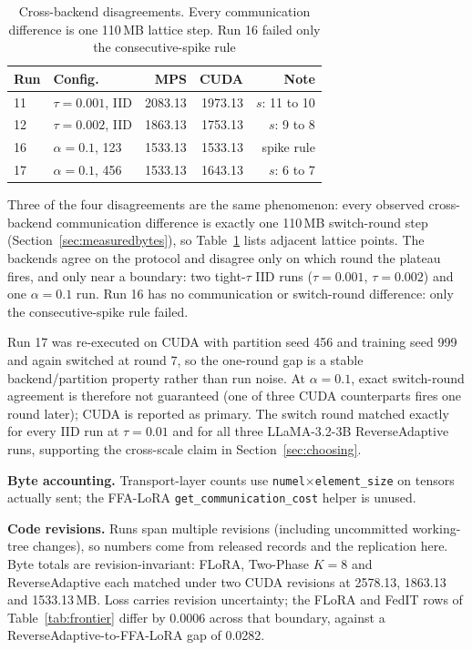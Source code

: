\documentclass[iicol,pdflatex,sn-mathphys-num]{sn-jnl}
\begin{document}
\begin{appendices}
\begin{table}[tbp]
\centering
\footnotesize
\scriptsize
\renewcommand{\arraystretch}{0.85}
\setlength{\tabcolsep}{3pt}
\caption{Cross-backend disagreements. Every communication difference is one 110\,MB lattice step. Run 16 failed only the consecutive-spike rule}
\label{tab:d2}
\begin{tabular}{@{}llrrr@{}}
\toprule
Run & Config. & MPS & CUDA & Note \\
\midrule
11 & $\tau{=}0.001$, IID & 2083.13 & 1973.13 & $s$: 11 to 10 \\
12 & $\tau{=}0.002$, IID & 1863.13 & 1753.13 & $s$: 9 to 8 \\
16 & $\alpha{=}0.1$, 123 & 1533.13 & 1533.13 & spike rule \\
17 & $\alpha{=}0.1$, 456 & 1533.13 & 1643.13 & $s$: 6 to 7 \\
\bottomrule
\end{tabular}
\end{table}

Three of the four disagreements are the same phenomenon: every observed cross-backend communication difference is exactly one 110\,MB switch-round step (Section~\ref{sec:measuredbytes}), so Table~\ref{tab:d2} lists adjacent lattice points. The backends agree on the protocol and disagree only on which round the plateau fires, and only near a boundary: two tight-$\tau$ IID runs ($\tau{=}0.001$, $\tau{=}0.002$) and one $\alpha{=}0.1$ run. Run 16 has no communication or switch-round difference: only the consecutive-spike rule failed.

Run 17 was re-executed on CUDA with partition seed 456 and training seed 999 and again switched at round 7, so the one-round gap is a stable backend/partition property rather than run noise. At $\alpha{=}0.1$, exact switch-round agreement is therefore not guaranteed (one of three CUDA counterparts fires one round later); CUDA is reported as primary. The switch round matched exactly for every IID run at $\tau{=}0.01$ and for all three LLaMA-3.2-3B ReverseAdaptive runs, supporting the cross-scale claim in Section~\ref{sec:choosing}.

\textbf{Byte accounting.} Transport-layer counts use \texttt{numel}$\times$\texttt{element\_size} on tensors actually sent; the FFA-LoRA \texttt{get\_communication\_cost} helper is unused.

\textbf{Code revisions.} Runs span multiple revisions (including uncommitted working-tree changes), so numbers come from released records and the replication here. Byte totals are revision-invariant: FLoRA, Two-Phase $K{=}8$ and ReverseAdaptive each matched under two CUDA revisions at 2578.13, 1863.13 and 1533.13\,MB. Loss carries revision uncertainty; the FLoRA and FedIT rows of Table~\ref{tab:frontier} differ by 0.0006 across that boundary, against a ReverseAdaptive-to-FFA-LoRA gap of 0.0282.
\end{appendices}
\end{document}
